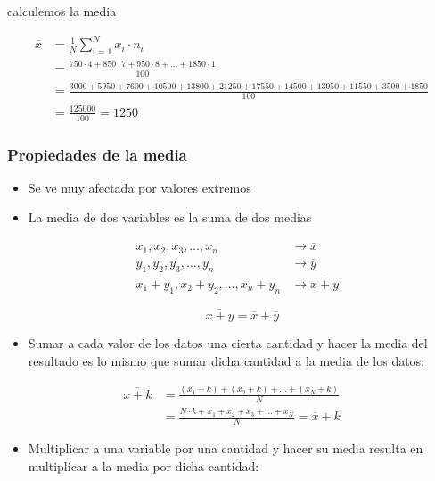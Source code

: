 \documentclass[
]{article}
\providecommand{\tightlist}{%
  \setlength{\itemsep}{0pt}\setlength{\parskip}{0pt}}
\begin{document}
calculemos la media

\begin{align*}
\overline x &= \frac{1}{N}\sum^{N}_{i=1} x_i  \cdot n_i\\
&= \frac{750  \cdot  4 + 850  \cdot  7 + 950 \cdot 8 +  \ldots + 1850 \cdot  1}{100}\\
& = \frac{3000  + 5950  + 7600  + 10500 + 13800 + 21250 + 17550 + 14500 + 13950 + 11550 + 3500  + 1850}{100}\\
&=\frac{125000}{100}=1250
\end{align*}

\hypertarget{propiedades-de-la-media}{%
\subsubsection{Propiedades de la media}\label{propiedades-de-la-media}}

\begin{itemize}
\item
  Se ve muy afectada por valores extremos
\item
  La media de dos variables es la suma de dos medias

  \begin{align*}
   x_1, x_2, x_3,\ldots , x_n &\longrightarrow \overline x\\
   y_1, y_2, y_3,\ldots , y_n &\longrightarrow \overline y
   &\\
   x_1 + y_1, x_2+y_2, \ldots , x_n + y_n & \longrightarrow \overline{x+y}
  \end{align*}

  \[\overline{x + y} = \overline x + \overline y\]
\item
  Sumar a cada valor de los datos una cierta cantidad y hacer la media
  del resultado es lo mismo que sumar dicha cantidad a la media de los
  datos:
\end{itemize}

\begin{align*}
\overline{x+k} &= \frac{(x_1 +k)+ (x_2+k) +\ldots  + (x_N +k) }{N}\\
&=\frac{N\cdot k + x_1+  x_2 +  x_3  +\ldots  +  x_N}{N} = \overline {x} +k
\end{align*}

\begin{itemize}
\tightlist
\item
  Multiplicar a una variable por una cantidad y hacer su media resulta
  en multiplicar a la media por dicha cantidad:
\end{itemize}
\end{document}
